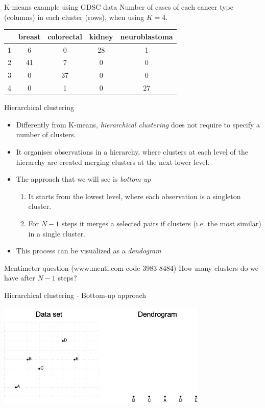 \documentclass[notes]{beamer}          %
\begin{document}
\begin{frame}{K-means example using GDSC data}
Number of cases of each cancer type (columns) in each cluster (rows), when using $K=4$.
\begin{center}
\begin{tabular}{ c | | c | c | c | c }
& breast & colorectal & kidney & neuroblastoma \\
\hline \hline
1 & 6 & 0 & 28 & 1 \\ 
2 & 41 & 7 & 0 & 0\\
3 & 0 & 37 & 0 & 0\\
4 & 0 & 1 & 0 & 27\\
\end{tabular}
\end{center}
\end{frame}



\begin{frame}{Hierarchical clustering}
\begin{itemize}
\item Differently from K-means, \textit{hierarchical clustering} does not require to specify a number of clusters.
\item It organises observations in a hierarchy, where clusters at each level of the hierarchy are created merging clusters at the next lower level.
\item The approach that we will see is \textit{bottom-up}
\begin{enumerate}
 \item It starts from the lowest level, where each observation is a singleton cluster.
 \item For $N-1$ steps it merges a selected pairs if clusters (i.e. the most similar) in a single cluster.
\end{enumerate}
\item This process can be visualized as a \textit{dendogram}
\end{itemize}
\end{frame}

\begin{frame}{Mentimeter question (www.menti.com code 3983 8484)}
How many clusters do we have after $N-1$ steps?
\end{frame}

\begin{frame}{Hierarchical clustering - Bottom-up approach }
\begin{center}
\includegraphics[height=5cm]{../figures/week_6/HierarchicalClustering_1.png}  
\end{center}
\end{frame}
\end{document}
